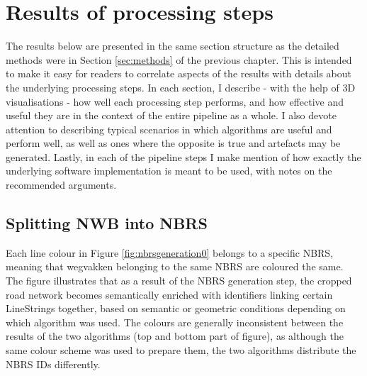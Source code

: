 \section{Results of processing steps}
\label{sec:results}

The results below are presented in the same section structure as the detailed methods were in Section \ref{sec:methods} of the previous chapter. This is intended to make it easy for readers to correlate aspects of the results with details about the underlying processing steps. In each section, I describe - with the help of 3D visualisations - how well each processing step performs, and how effective and useful they are in the context of the entire pipeline as a whole. I also devote attention to describing typical scenarios in which algorithms are useful and perform well, as well as ones where the opposite is true and artefacts may be generated. Lastly, in each of the pipeline steps I make mention of how exactly the underlying software implementation is meant to be used, with notes on the recommended arguments.

\subsection{Splitting NWB into NBRS}
\label{sub:r_nbrsgeneration}

Each line colour in Figure \ref{fig:nbrsgeneration0} belongs to a specific NBRS, meaning that wegvakken belonging to the same NBRS are coloured the same. The figure illustrates that as a result of the NBRS generation step, the cropped road network becomes semantically enriched with identifiers linking certain LineStrings together, based on semantic or geometric conditions depending on which algorithm was used. The colours are generally inconsistent between the results of the two algorithms (top and bottom part of figure), as although the same colour scheme was used to prepare them, the two algorithms distribute the NBRS IDs differently.

